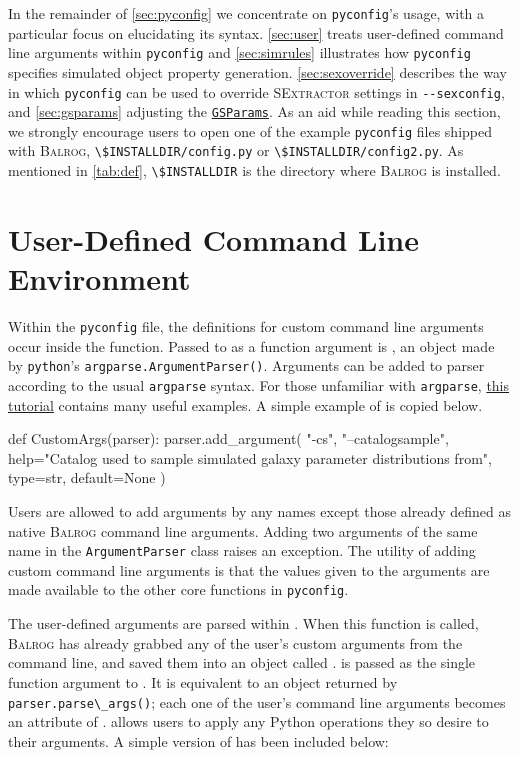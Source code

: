 \documentclass[11pt]{book}
\newcommand{\codett}[1]{\lstinline{#1}}
\newcommand{\py}{Python}
\newcommand{\pyconfig}{\codett{pyconfig}}
\newcommand{\balrog}{\textsc{Balrog}}
\newcommand{\sex}{\textsc{SExtractor}}
\newcommand{\opt}[1]{\codett{--#1}}
\begin{document}
In the remainder of \autoref{sec:pyconfig} we concentrate on \pyconfig{}'s usage, with a particular focus on elucidating its syntax.
\autoref{sec:user} treats user-defined command line arguments within \pyconfig{} and 
\autoref{sec:simrules} illustrates how \pyconfig{} specifies simulated object property generation.
\autoref{sec:sexoverride} describes the way in which \pyconfig{} can be used to override \sex{} settings in \opt{sexconfig},
and \autoref{sec:gsparams} adjusting the \href{http://galsim-developers.github.io/GalSim/structgalsim\_1\_1\_g\_s\_params.html}{\texttt{GSParams}}.
As an aid while reading this section, 
we strongly encourage users to open one of the example \pyconfig{} files shipped with \balrog{},
\codett{\$INSTALLDIR/config.py} or \codett{\$INSTALLDIR/config2.py}.
As mentioned in \autoref{tab:def}, \codett{\$INSTALLDIR} is the directory where \balrog{} is installed.

\section{User-Defined Command Line Environment}
\label{sec:user}

Within the \pyconfig{} file, the definitions for custom command line arguments occur inside the \argsfunc{} function.
Passed to \argsfunc{}  as a function argument is \argsparser{},
an object made by \codett{python}'s
\codett{argparse.ArgumentParser()}. Arguments
can be added to parser according to the usual
\codett{argparse} syntax.
For those unfamiliar with \codett{argparse},
\href{http://docs.python.org/2/howto/argparse.html}{this tutorial}
contains many useful examples. A simple example of
\argsfunc{} is copied below.

\begin{code}
def CustomArgs(parser):
    parser.add_argument( "-cs", "--catalogsample", help="Catalog used to sample simulated galaxy parameter distributions from", type=str, default=None )
\end{code}

\noindent Users are allowed to add arguments by any names except those already defined as native \balrog{} command line arguments.
Adding two arguments of the same name in the \codett{ArgumentParser} class raises an exception.
The utility of adding custom command line arguments is that the values given to the arguments
are made available to the other core functions in \pyconfig{}.

The user-defined arguments are parsed within \parsefunc{}.
When this function is called, 
\balrog{} has already grabbed any of the user's custom arguments from the command line,
and saved them into an object called \parseargs{}.
\parseargs{} is passed as the single function argument to \parsefunc{}.
It is equivalent to an object returned by \codett{parser.parse\_args()};
each one of the user's command line arguments becomes an attribute of \parseargs{}. 
\parsefunc{} allows users to apply any \py{} operations they so desire to their arguments.
A simple version of \parsefunc{} has been included below:
\end{document}
